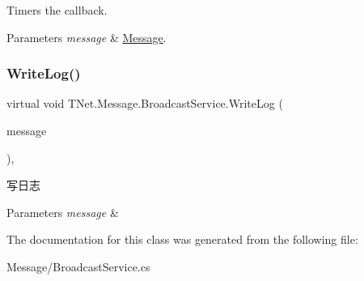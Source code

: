 Timers the callback. 


\begin{DoxyParams}{Parameters}
{\em message} & \mbox{\hyperlink{namespace_t_net_1_1_message}{Message}}.\\
\hline
\end{DoxyParams}
\mbox{\label{class_t_net_1_1_message_1_1_broadcast_service_abb5f6c7e9682d075d5aebfe2fffaa5b7}} 
\subsubsection{\texorpdfstring{Write\+Log()}{WriteLog()}}
{\footnotesize\ttfamily virtual void T\+Net.\+Message.\+Broadcast\+Service.\+Write\+Log (\begin{DoxyParamCaption}\item[{\mbox{\hyperlink{class_t_net_1_1_message_1_1_notice_message}{Notice\+Message}}}]{message }\end{DoxyParamCaption})\hspace{0.3cm}{\ttfamily [protected]}, {\ttfamily [virtual]}}



写日志 


\begin{DoxyParams}{Parameters}
{\em message} & \\
\hline
\end{DoxyParams}


The documentation for this class was generated from the following file\+:\begin{DoxyCompactItemize}
\item 
Message/Broadcast\+Service.\+cs\end{DoxyCompactItemize}
